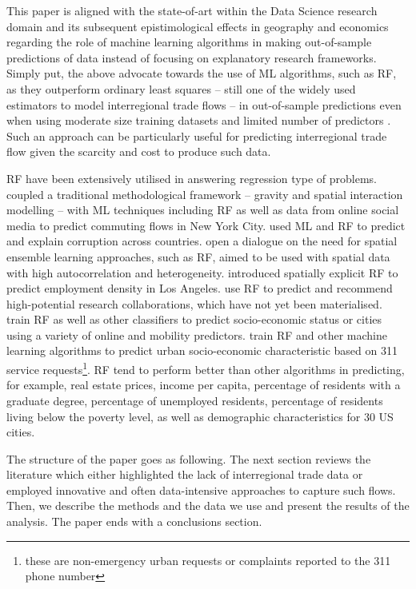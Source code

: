 \documentclass[sigconf]{acmart}
\begin{document}
This paper is aligned with the state-of-art within the Data Science
research domain and its subsequent epistimological effects in geography
\citep{singleton2021geographic, creditspatial} and economics
\citep{kleinberg2015prediction} regarding the role of machine learning
algorithms in making out-of-sample predictions of data instead of
focusing on explanatory research frameworks. Simply put, the above
advocate towards the use of ML algorithms, such as RF, as they
outperform ordinary least squares -- still one of the widely used
estimators to model interregional trade flows -- in out-of-sample
predictions even when using moderate size training datasets and limited
number of predictors \citep{mullainathan2017machine, athey2019machine}.
Such an approach can be particularly useful for predicting interregional
trade flow given the scarcity and cost to produce such data.

RF have been extensively utilised in answering regression type of
problems. \citet{pourebrahim2019trip} coupled a traditional
methodological framework -- gravity and spatial interaction modelling --
with ML techniques including RF as well as data from online social media
to predict commuting flows in New York City. \citet{lima2020predicting}
used ML and RF to predict and explain corruption across countries.
\citet{sinha2019assessing} open a dialogue on the need for spatial
ensemble learning approaches, such as RF, aimed to be used with spatial
data with high autocorrelation and heterogeneity. \citet{creditspatial}
introduced spatially explicit RF to predict employment density in Los
Angeles. \citet{guns2014recommending} use RF to predict and recommend
high-potential research collaborations, which have not yet been
materialised.\\
\citet{ren2019predicting} train RF as well as other classifiers to
predict socio-economic status or cities using a variety of online and
mobility predictors. \citet{wang2017structure} train RF and other
machine learning algorithms to predict urban socio-economic
characteristic based on 311 service requests\footnote{these are
	non-emergency urban requests or complaints reported to the 311 phone
	number}. RF tend to perform better than other algorithms in
predicting, for example, real estate prices, income per capita,
percentage of residents with a graduate degree, percentage of unemployed
residents, percentage of residents living below the poverty level, as
well as demographic characteristics for 30 US cities.

The structure of the paper goes as following. The next section reviews
the literature which either highlighted the lack of interregional trade
data or employed innovative and often data-intensive approaches to
capture such flows. Then, we describe the methods and the data we use
and present the results of the analysis. The paper ends with a
conclusions section.
\end{document}
